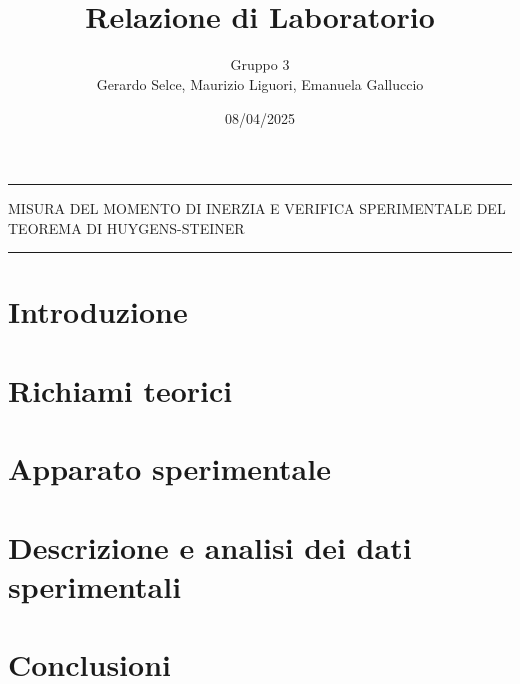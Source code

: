 \documentclass[11pt]{article}
\begin{document}
	\setlength{\parindent}{0pt}
	\title{\vspace{-4em}{\large Laboratorio di Meccanica e Termodinamica} \\
		Relazione di Laboratorio}
	\author{Gruppo 3 \\
		Gerardo Selce, Maurizio Liguori, Emanuela Galluccio}
	\date{08/04/2025}
	\maketitle
	
	\vspace{-2em}\par\noindent\rule{\textwidth}{0.4pt}
	\begin{center}
		{\Large\sc MISURA DEL MOMENTO DI INERZIA E VERIFICA SPERIMENTALE DEL TEOREMA DI HUYGENS-STEINER}
	\end{center}
	\par\noindent\rule{\textwidth}{0.4pt}
	
	
	\section{Introduzione}
	
	
	\section{Richiami teorici}
	
	
	\section{Apparato sperimentale}
	
	
	\section{Descrizione e analisi dei dati sperimentali}
	
	
	\section{Conclusioni}
	
	
\end{document}
